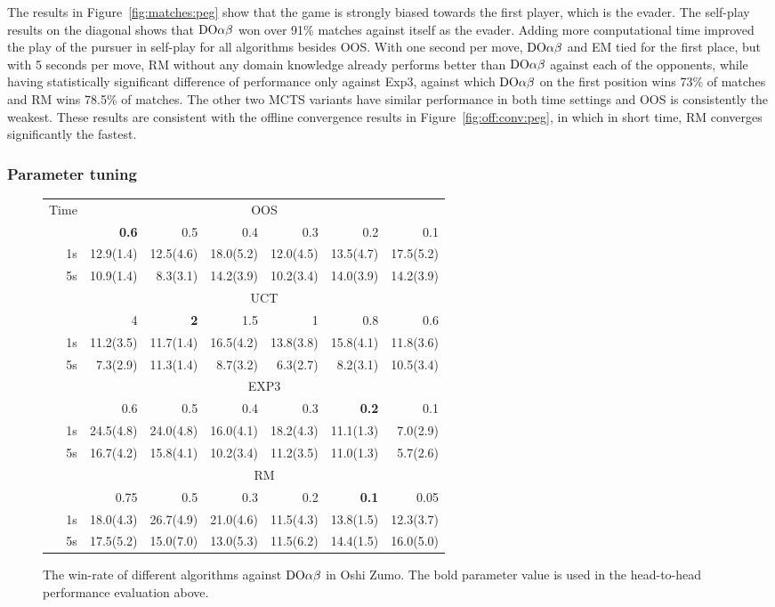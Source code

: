 The results in Figure~\ref{fig:matches:peg} show that the game is strongly biased towards the first player, which is the evader. The self-play results on the diagonal shows that $\textrm{DO}\alpha\beta$ won over 91\% matches against itself as the evader. Adding more computational time improved the play of the pursuer in self-play for all algorithms besides OOS. With one second per move, $\textrm{DO}\alpha\beta$ and EM tied for the first place, but with 5 seconds per move, RM without any domain knowledge already performs better than $\textrm{DO}\alpha\beta$ against each of the opponents, while having statistically significant difference of performance only against Exp3, against which $\textrm{DO}\alpha\beta$ on the first position wins 73\% of matches and RM wins 78.5\% of matches. The other two MCTS variants have similar performance in both time settings and OOS is consistently the weakest. 
These results are consistent with the offline convergence results in Figure~\ref{fig:off:conv:peg}, in which in short time, RM converges significantly the fastest.

\subsubsection{Parameter tuning}\label{sec:eval:online:tuning}

\begin{figure}
\centering
\begin{scriptsize}
\begin{tabular}{|r|rrrrrr|}\hline
Time&\multicolumn{6}{|c|}{OOS}\\
&\textbf{0.6}&0.5&0.4&0.3&0.2&0.1\\
1s&12.9(1.4)&12.5(4.6)&18.0(5.2)&12.0(4.5)&13.5(4.7)&17.5(5.2)\\
5s&10.9(1.4)&8.3(3.1)&14.2(3.9)&10.2(3.4)&14.0(3.9)&14.2(3.9)\\\hline
&\multicolumn{6}{|c|}{UCT}\\
&4&\textbf{2}&1.5&1&0.8&0.6\\
1s&11.2(3.5)&11.7(1.4)&16.5(4.2)&13.8(3.8)&15.8(4.1)&11.8(3.6)\\
5s&7.3(2.9)&11.3(1.4)&8.7(3.2)&6.3(2.7)&8.2(3.1)&10.5(3.4)\\\hline
&\multicolumn{6}{|c|}{EXP3}\\
&0.6&0.5&0.4&0.3&\textbf{0.2}&0.1\\
1s&24.5(4.8)&24.0(4.8)&16.0(4.1)&18.2(4.3)&11.1(1.3)&7.0(2.9)\\
5s&16.7(4.2)&15.8(4.1)&10.2(3.4)&11.2(3.5)&11.0(1.3)&5.7(2.6)\\\hline
&\multicolumn{6}{|c|}{RM}\\
&0.75&0.5&0.3&0.2&\textbf{0.1}&0.05\\
1s&18.0(4.3)&26.7(4.9)&21.0(4.6)&11.5(4.3)&13.8(1.5)&12.3(3.7)\\
5s&17.5(5.2)&15.0(7.0)&13.0(5.3)&11.5(6.2)&14.4(1.5)&16.0(5.0)\\\hline
\end{tabular}

\end{scriptsize}
\caption{The win-rate of different algorithms against $\textrm{DO}\alpha\beta$ in Oshi Zumo. The bold parameter value is used in the head-to-head performance evaluation above.}\label{fig:tuning}
\end{figure}

